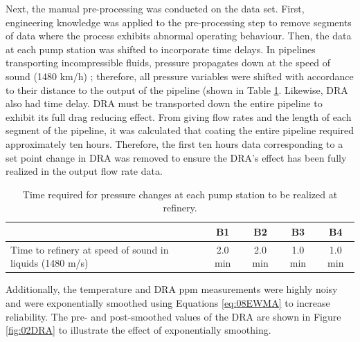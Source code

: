 Next, the manual pre-processing was conducted on the data set.  First, engineering knowledge was applied to the pre-processing step to remove segments of data where the process exhibits abnormal operating behaviour.  Then, the data at each pump station was shifted to incorporate time delays. In pipelines transporting incompressible fluids, pressure propagates down at the speed of sound (1480 km/h) \cite{fluid_mechanics}; therefore, all pressure variables were shifted with accordance to their distance to the output of the pipeline (shown in Table \ref{tab:02TimeToCC}.  Likewise, DRA also had time delay.  DRA must be transported down the entire pipeline to exhibit its full drag reducing effect.  From giving flow rates and the length of each segment of the pipeline, it was calculated that coating the entire pipeline required approximately ten hours.  Therefore, the first ten hours data corresponding to a set point change in DRA was removed to ensure the DRA's effect has been fully realized in the output flow rate data.

\begin{table}[h]
    \centering
    {
    \begin{tabular}{ p{6cm} | c | c | c | c}
             & B1 & B2 & B3 & B4 \\
        \hline
        Time to refinery at speed of sound in liquids (1480 m/s) \cite{fluid_mechanics}
        &  2.0 min  &  2.0 min  &  1.0 min  &  1.0 min  \\
    \end{tabular}}
    \caption{Time required for pressure changes at each pump station to be realized at refinery.}
    \label{tab:02TimeToCC}
\end{table}

Additionally, the temperature and DRA ppm measurements were highly noisy and were exponentially smoothed using Equations \ref{eq:08EWMA} to increase reliability.  The pre- and post-smoothed values of the DRA are shown in Figure \ref{fig:02DRA} to illustrate the effect of exponentially smoothing.

